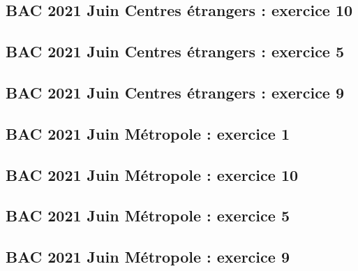 \documentclass[lang=fr,edition=teacher,layout=sheet]{mxbook}
\begin{document}
\begingroup\endgroup
\par\bigskip
{}\subsection*{BAC 2021 Juin Centres étrangers : exercice 10}
\begingroup\endgroup
\par\bigskip
{}\subsection*{BAC 2021 Juin Centres étrangers : exercice 5}
\begingroup\endgroup
\par\bigskip
{}\subsection*{BAC 2021 Juin Centres étrangers : exercice 9}
\begingroup\endgroup
\par\bigskip
{}\subsection*{BAC 2021 Juin Métropole : exercice 1}
\begingroup\endgroup
\par\bigskip
{}\subsection*{BAC 2021 Juin Métropole : exercice 10}
\begingroup\endgroup
\par\bigskip
{}\subsection*{BAC 2021 Juin Métropole : exercice 5}
\begingroup\endgroup
\par\bigskip
{}\subsection*{BAC 2021 Juin Métropole : exercice 9}
\end{document}
